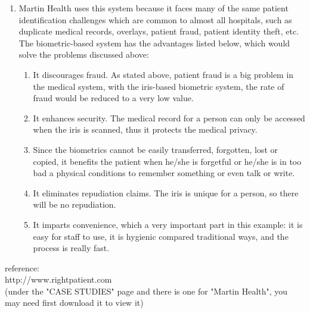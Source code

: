 \documentclass[a4paper]{article}
\begin{document}
\begin{spacing}{2.0}
\begin{enumerate}
\begin{enumerate}
\item Martin Health uses this system because it faces many of the same patient identification challenges which are common to almost all hospitals, such as duplicate medical records, overlays, patient fraud, patient identity theft, etc. The biometric-based system has the advantages listed below, which would solve the problems discussed above:
\begin{enumerate}
\item It discourages fraud. As stated above, patient fraud is a big problem in the medical system, with the iris-based biometric system, the rate of fraud would be reduced to a very low value.
\item It enhances security. The medical record for a person can only be accessed when the iris is scanned, thus it protects the medical privacy.
\item Since the biometrics cannot be easily transferred, forgotten, lost or copied, it benefits the patient when he/she is forgetful or he/she is in too bad a physical conditions to remember something or even talk or write.
\item It eliminates repudiation claims. The iris is unique for a person, so there will be no repudiation.
\item It imparts convenience, which a very important part in this example: it is easy for staff to use, it is hygienic compared traditional ways, and the process is really fast.
\end{enumerate}
\end{enumerate}
reference: \\
http://www.rightpatient.com\\
(under the "CASE STUDIES" page and there is one for "Martin Health", you may need first download it to view it)
\end{enumerate}
\end{spacing}
\end{document}

